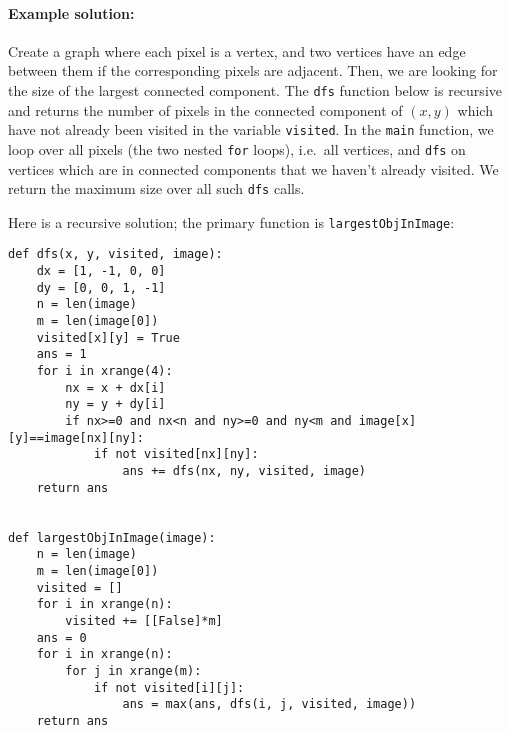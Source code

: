 \documentclass[11pt]{article}
\begin{document}
\paragraph{Example solution:}
Create a graph where each pixel is a vertex, and two
vertices have an edge between them if the corresponding pixels are
adjacent. Then, we are looking for the size of the largest connected
component. The \texttt{dfs} function below is recursive and returns
the number of pixels in the connected component of $(x,y)$ which have
not already been visited in the variable \texttt{visited}. In the
\texttt{main} function, we loop over all pixels (the two nested
\texttt{for} loops), i.e.\ all vertices, and \texttt{dfs} on vertices
which are in connected components that we haven't already visited.  We
return the maximum size over all such \texttt{dfs} calls.

\medskip

Here is a recursive solution; the primary function is \texttt{largestObjInImage}:

\begin{verbatim}
def dfs(x, y, visited, image):
	dx = [1, -1, 0, 0]
	dy = [0, 0, 1, -1]
	n = len(image)
	m = len(image[0])
	visited[x][y] = True
	ans = 1
	for i in xrange(4):
		nx = x + dx[i]
		ny = y + dy[i]
		if nx>=0 and nx<n and ny>=0 and ny<m and image[x][y]==image[nx][ny]:
			if not visited[nx][ny]:
				ans += dfs(nx, ny, visited, image)
	return ans


def largestObjInImage(image):
	n = len(image)
	m = len(image[0])
	visited = []
	for i in xrange(n):
		visited += [[False]*m]
	ans = 0
	for i in xrange(n):
		for j in xrange(m):
			if not visited[i][j]:
				ans = max(ans, dfs(i, j, visited, image))
	return ans
\end{verbatim}
\end{document}
